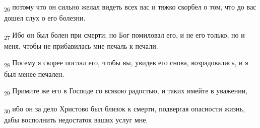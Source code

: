 \begin{tcolorbox}
\textsubscript{26} потому что он сильно желал видеть всех вас и тяжко скорбел о том, что до вас дошел слух о его болезни.
\end{tcolorbox}
\begin{tcolorbox}
\textsubscript{27} Ибо он был болен при смерти; но Бог помиловал его, и не его только, но и меня, чтобы не прибавилась мне печаль к печали.
\end{tcolorbox}
\begin{tcolorbox}
\textsubscript{28} Посему я скорее послал его, чтобы вы, увидев его снова, возрадовались, и я был менее печален.
\end{tcolorbox}
\begin{tcolorbox}
\textsubscript{29} Примите же его в Господе со всякою радостью, и таких имейте в уважении,
\end{tcolorbox}
\begin{tcolorbox}
\textsubscript{30} ибо он за дело Христово был близок к смерти, подвергая опасности жизнь, дабы восполнить недостаток ваших услуг мне.
\end{tcolorbox}
